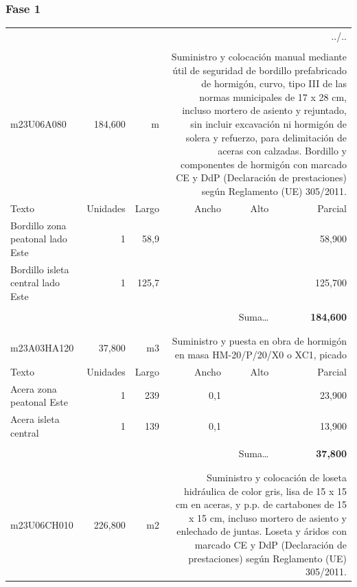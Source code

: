 \documentclass{book}%
\begin{document}
\subsubsection{Fase 1}%
\begin{longtable}{lrrrrr}%
\multicolumn{6}{r}{../..}\\%
\endfoot%
\endlastfoot%
&&&&&\\%
m23U06A080&   184,600& m&\multicolumn{3}{p{6cm}}{\scriptsize Suministro y colocación manual mediante útil de seguridad de bordillo prefabricado de hormigón, curvo, tipo III de las normas municipales de 17 x 28 cm, incluso mortero de asiento y rejuntado, sin incluir excavación ni hormigón de solera y refuerzo, para delimitación de aceras con calzadas. Bordillo y componentes de hormigón con marcado CE y DdP (Declaración de prestaciones) según Reglamento (UE) 305/2011.\normalsize}\\%
Texto&Unidades&Largo&Ancho&Alto&Parcial\\%
\hline%
\multicolumn{1}{p{3.5cm}}{Bordillo  zona peatonal lado Este}&1&58,9&&&    58,900\\%
\multicolumn{1}{p{3.5cm}}{Bordillo  isleta central lado Este}&1&125,7&&&   125,700\\%
&&&&&\\%
\multicolumn{5}{r}{Suma\ldots}&\textbf{   184,600}\\%
\hline%
&&&&&\\%
&&&&&\\%
m23A03HA120&    37,800& m3&\multicolumn{3}{p{6cm}}{\scriptsize Suministro y puesta en obra de hormigón en masa HM-20/P/20/X0 o XC1, picado\normalsize}\\%
Texto&Unidades&Largo&Ancho&Alto&Parcial\\%
\hline%
\multicolumn{1}{p{3.5cm}}{Acera zona peatonal Este}&1&239&0,1&&    23,900\\%
\multicolumn{1}{p{3.5cm}}{Acera isleta central}&1&139&0,1&&    13,900\\%
&&&&&\\%
\multicolumn{5}{r}{Suma\ldots}&\textbf{    37,800}\\%
\hline%
&&&&&\\%
&&&&&\\%
m23U06CH010&   226,800& m2&\multicolumn{3}{p{6cm}}{\scriptsize Suministro y colocación de loseta hidráulica de color gris, lisa de 15 x 15 cm en aceras, y p.p. de cartabones de 15 x 15 cm, incluso mortero de asiento y enlechado de juntas. Loseta y áridos con marcado CE y DdP (Declaración de prestaciones) según Reglamento (UE) 305/2011.\normalsize}\\%

\end{longtable}
\end{document}
